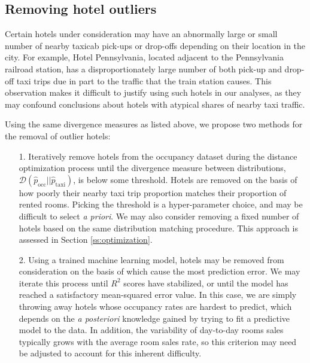 \documentclass[useAMS, usenatbib]{biom}
\begin{document}
\subsection{Removing hotel outliers}
\label{ss:hotel_outliers}

Certain hotels under consideration may have an abnormally large or small number of nearby taxicab pick-ups or drop-offs depending on their location in the city. For example, Hotel Pennsylvania, located adjacent to the Pennsylvania railroad station, has a disproportionately large number of both pick-up and drop-off taxi trips due in part to the traffic that the train station causes. This observation makes it difficult to justify using such hotels in our analyses, as they may confound conclusions about hotels with atypical shares of nearby taxi traffic.

Using the same divergence measures as listed above, we propose two methods for the removal of outlier hotels:

\begin{itemize}

\item [1.] Iteratively remove hotels from the occupancy dataset during the distance optimization process until the divergence measure between distributions, $\mathcal{D} (\hat{p}_{\mathrm{occ}} || \hat{p}_{\mathrm{taxi}})$, is below some threshold. Hotels are removed on the basis of how poorly their nearby taxi trip proportion matches their proportion of rented rooms. Picking the threshold is a hyper-parameter choice, and may be difficult to select \textit{a priori}. We may also consider removing a fixed number of hotels based on the same distribution matching procedure. This approach is assessed in Section \ref{ss:optimization}.

\item [2.] Using a trained machine learning model, hotels may be removed from consideration on the basis of which cause the most prediction error. We may iterate this process until $R^2$ scores have stabilized, or until the model has reached a satisfactory mean-squared error value. In this case, we are simply throwing away hotels whose occupancy rates are hardest to predict, which depends on the \textit{a posteriori} knowledge gained by trying to fit a predictive model to the data. In addition, the variability of day-to-day rooms sales typically grows with the average room sales rate, so this criterion may need be adjusted to account for this inherent difficulty.

\end{itemize}
\end{document}
